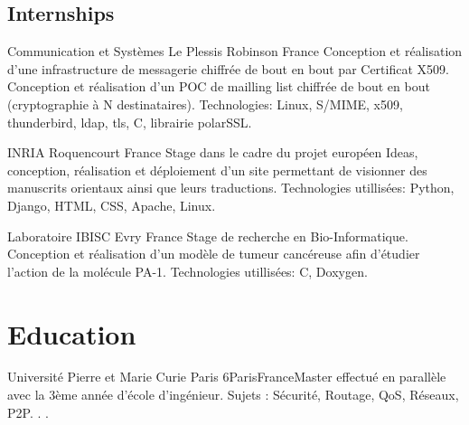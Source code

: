 \documentclass[10pt,a4paper]{moderncv}
\begin{document}
\subsection{Internships}

              {Communication et Systèmes}
              {Le Plessis Robinson}
              {France}
              {Conception et réalisation d'une infrastructure de messagerie chiffrée de bout en bout par
               Certificat X509. Conception et réalisation d'un POC de mailling list chiffrée de bout en bout
               (cryptographie à N destinataires).
               \newline Technologies: Linux, S/MIME, x509, thunderbird, ldap, tls, C, librairie polarSSL.
              }

              {INRIA}
              {Roquencourt}
              {France}
              {Stage dans le cadre du projet européen Ideas, 
                 conception, réalisation et déploiement d'un site permettant de visionner 
                 des manuscrits orientaux ainsi que leurs traductions.
                 \newline Technologies utillisées: Python, Django, HTML, CSS, Apache, Linux.
              }

              {Laboratoire IBISC}
              {Evry}
              {France}
              {Stage de recherche en Bio-Informatique. Conception
                et réalisation d'un modèle de tumeur
                cancéreuse afin d'étudier l'action de la molécule PA-1.
                \newline Technologies utillisées: C, Doxygen.
              }


\section{Education}
{Université Pierre et Marie Curie Paris 6}{Paris}{France}{Master effectué en parallèle avec la 3ème année d’école d’ingénieur. Sujets : Sécurité, Routage,
QoS, Réseaux, P2P. . .}
\end{document}
